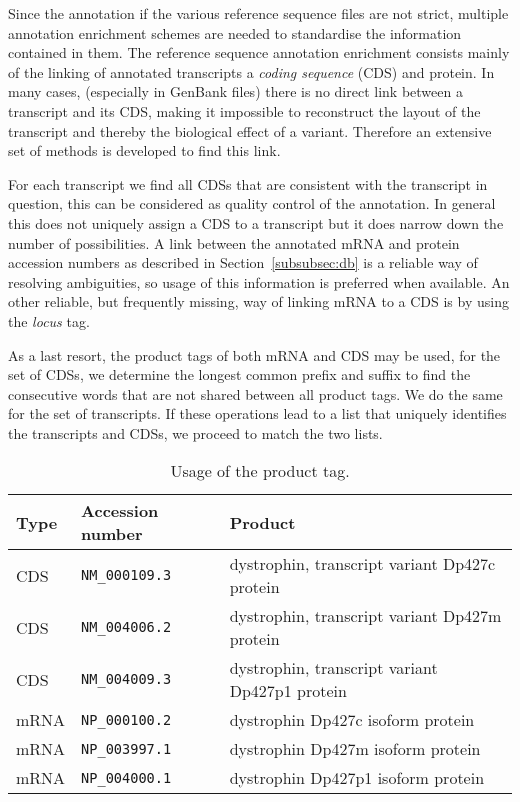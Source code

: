 \documentclass{article}
\begin{document}
Since the annotation if the various reference sequence files are not strict,
multiple annotation enrichment schemes are needed to standardise the
information contained in them. The reference sequence annotation enrichment
consists mainly of the linking of annotated transcripts a \emph{coding
sequence} (CDS) and protein. In many cases, (especially in GenBank files) there
is no direct link between a transcript and its CDS, making it impossible to
reconstruct the layout of the transcript and thereby the biological effect of a
variant. Therefore an extensive set of methods is developed to find this link.

For each transcript we find all CDSs that are consistent with the transcript in
question, this can be considered as quality control of the annotation. In
general this does not uniquely assign a CDS to a transcript but it does narrow
down the number of possibilities. A link between the annotated mRNA and protein
accession numbers as described in Section~\ref{subsubsec:db} is a reliable way
of resolving ambiguities, so usage of this information is preferred when
available. An other reliable, but frequently missing, way of linking mRNA to a
CDS is by using the \emph{locus} tag.

As a last resort, the product tags of both mRNA and CDS may be used, for the
set of CDSs, we determine the longest common prefix and suffix to find the
consecutive words that are not shared between all product tags. We do the same
for the set of transcripts. If these operations lead to a list that uniquely
identifies the transcripts and CDSs, we proceed to match the two lists.

\begin{table}[]
  \caption{Usage of the product tag.}
  \label{tab:product}
  \begin{center}
    \begin{tabular}{lll}
      Type & Accession number & Product\\
      \hline
      CDS  & \texttt{NM\_000109.3} & dystrophin, transcript variant Dp427c
        protein\\
      CDS  & \texttt{NM\_004006.2} & dystrophin, transcript variant Dp427m
        protein\\
      CDS  & \texttt{NM\_004009.3} & dystrophin, transcript variant Dp427p1
        protein\\
      mRNA & \texttt{NP\_000100.2} & dystrophin Dp427c isoform protein\\
      mRNA & \texttt{NP\_003997.1} & dystrophin Dp427m isoform protein\\
      mRNA & \texttt{NP\_004000.1} & dystrophin Dp427p1 isoform protein\\
    \end{tabular}
  \end{center}
\end{table}
\end{document}
